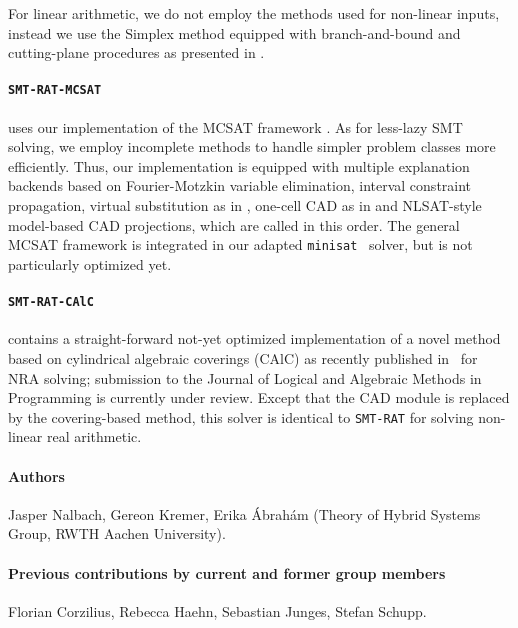 \documentclass{article}
\begin{document}
For linear arithmetic, we do not employ the methods used for non-linear inputs, instead we use the Simplex method equipped with branch-and-bound and cutting-plane procedures as presented in \cite{DM06}.


\paragraph{\texttt{SMT-RAT-MCSAT}} uses our implementation of the MCSAT framework \cite{Moura2013}.
As for less-lazy SMT solving, we employ incomplete methods to handle simpler problem classes more efficiently. Thus, our implementation is equipped with multiple explanation backends based on Fourier-Motzkin variable elimination, interval constraint propagation, virtual substitution as in \cite{Abraham2017}, one-cell CAD as in \cite{Neuss2018} and NLSAT-style model-based CAD projections, which are called in this order. The general MCSAT framework is integrated in our adapted \texttt{minisat}~\cite{Een2003} solver, but is not particularly optimized yet.

\paragraph{\texttt{SMT-RAT-CAlC}} contains a straight-forward not-yet optimized implementation of a novel method based on cylindrical algebraic coverings (CAlC) as recently published in~\cite{Abraham2020} for NRA solving; submission to the Journal of Logical and Algebraic Methods in Programming is currently under review. Except that the CAD module is replaced by the covering-based method, this solver is identical to \texttt{SMT-RAT} for solving non-linear real arithmetic.

\newpage

\paragraph{Authors}
Jasper Nalbach, Gereon Kremer, Erika \'Abrah\'am
(Theory of Hybrid Systems Group, RWTH Aachen University).

\paragraph{Previous contributions by current and former group members}
Florian Corzilius,
Rebecca Haehn,
Sebastian Junges,
Stefan Schupp.




\end{document}
